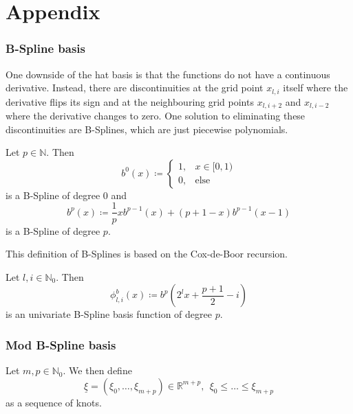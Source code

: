 \documentclass[
  a4paper,  %
  twoside,  %
  bibliography=totoc,
  headsepline,
  cleardoublepage=empty,
  parskip=half,
  draft=false
]{scrbook}
\begin{document}
\appendix
\chapter{Appendix}

\subsection{B-Spline basis}

One downside of the hat basis is that the functions do not have a continuous derivative.
Instead, there are discontinuities at the grid point $x_{l,i}$ itself where the derivative flips its sign and at the neighbouring grid points $x_{l,i+2}$ and $x_{l,i-2}$ where the derivative changes to zero.
One solution to eliminating these discontinuities are B-Splines, which are just piecewise polynomials.
\begin{definition}[B-Splines]
Let $p \in \mathds{N}$.
Then
\begin{equation}
b^0(x) \coloneqq
\begin{cases}
    1, & x \in [0,1) \\
   0, & \text{else}
\end{cases}
\end{equation}
is a B-Spline of degree $0$ and
\begin{equation}
b^p(x) \coloneqq \frac{1}{p} xb^{p-1}(x) + (p + 1 - x) b^{p-1}(x-1)
\end{equation}
is a B-Spline of degree $p$.
\end{definition}
This definition of B-Splines is based on the Cox-de-Boor recursion.

\begin{definition}
Let $l,i \in \mathds{N}_0$.
Then
\begin{equation}
\phi^b_{l,i}(x) \coloneqq b^p \left( 2^l x + \frac{p+1}{2} -i \right)
\end{equation}
is an univariate B-Spline basis function of degree $p$.
\end{definition}

\subsection{Mod B-Spline basis}

\begin{definition}[Knots]
Let $m,p \in \mathds{N}_0$.
We then define
\begin{equation}
\underline{\xi}=(\xi_0, \dots, \xi_{m + p}) \in \mathds{R}^{m + p}, ~~ \xi_0 \leq \dots \leq \xi_{m + p}
\end{equation}
as a sequence of knots.
\end{definition}
\end{document}
